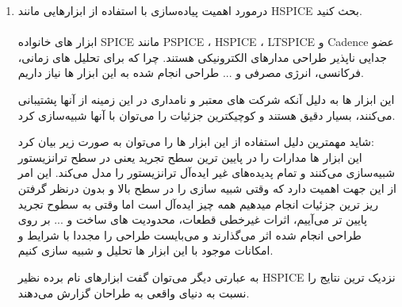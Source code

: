\documentclass[12pt]{exam}
\begin{document}
\begin{questions}
\begin{enumerate}
 	همچنین شبیه‌ساز HSPICE ابزاری‌ست غیر رایگان و برای استفاده از آن می‌بایست لایستس آن را از شرکت Synopsys خریداری کنیم\footnote{هر چند که ما در ایران آن را کرک می‌کنیم و به رایگان استفاده می‌کنیم، ولی خب :) }
 	می‌توان گفت دلیل دیگر توسعه شبیه‌ساز های جدید م عمدتا متن باز به همین دلیل است که استفاده و توسعه شبیه‌ساز راحت باشد. چرا که با ظهور تکنولوژی های جدید و حافظه های نو ظهور، مدت زیادی طول خواهد کشید تا شرکت Synopsys تنظیمات شبیه سازش را با تکنولوژی جدید بروز کند اما اگر ابزار متن باز وجود داشته باشد، فرآیند بروزرسانی و توسعه ابزار برای تکنولوژی جدید سریعتر انجام خواهد شد. \\ \\ \\
 
 	\item درمورد اهمیت پیاده‌سازی با استفاده از ابزار‌هایی مانند HSPICE بحث کنید.\\ \\
 	ابزار های خانواده SPICE مانند PSPICE ، HSPICE ، LTSPICE و Cadence عضو جدایی ناپذیر طراحی مدارهای الکترونیکی هستند. چرا که برای تحلیل های زمانی، فرکانسی، انرژی مصرفی و ... طراحی انجام شده به این ابزار ها نیاز داریم.
 	
 این ابزار ها به دلیل آنکه شرکت های معتبر و نامداری در این زمینه از آنها پشتیبانی می‌کنند، بسیار دقیق هستند و کوچیکترین جزئیات را می‌توان با آنها شبیه‌سازی کرد.
 
 شاید مهمترین دلیل استفاده از این ابزار ها را می‌توان به صورت زیر بیان کرد:\\
 این ابزار ها مدارات را در پایین ترین سطح تجرید یعنی در سطح ترانزیستور شبیه‌سازی می‌کنند و تمام پدیده‌های غیر ایده‌آل ترانزیستور را مدل می‌کند. این امر از این جهت اهمیت دارد که وقتی شبیه سازی را در سطح بالا و بدون درنظر گرفتن ریز ترین جزئیات انجام میدهیم همه چیز ایده‌آل است اما وقتی به سطوح تجرید پایین تر می‌آییم، اثرات غیرخطی قطعات، محدودیت های ساخت و ... بر روی طراحی انجام شده اثر می‌گذارند و می‌بایست طراحی را مجددا با شرایط و امکانات موجود با این ابزار ها تحلیل و شبیه سازی کنیم.
 
 به عبارتی دیگر می‌توان گفت ابزار‌های نام برده نظیر HSPICE نزدیک ترین نتایج را نسبت به دنیای واقعی به طراحان گزارش می‌دهند.
 \end{enumerate}
 
 \end{questions}
\end{document}
